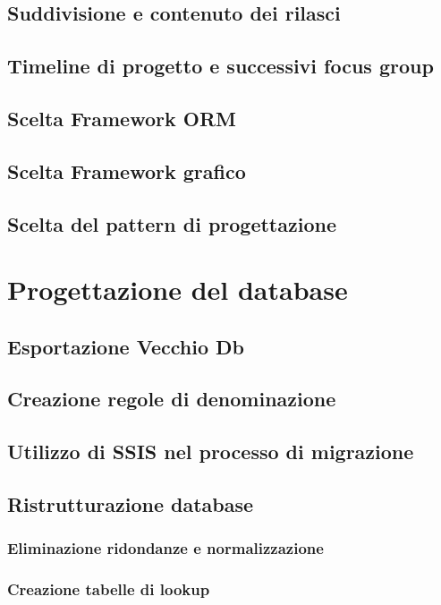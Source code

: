 \documentclass[12pt, a4paper]{article}
\begin{document}
\subsection{Suddivisione e contenuto dei rilasci}
\subsection{Timeline di progetto e successivi focus group}
\subsection{Scelta Framework ORM}
\subsection{Scelta Framework grafico} %
\subsection{Scelta del pattern di progettazione} %

\newpage
%
\section{Progettazione del database}
\subsection{Esportazione Vecchio Db}
\subsection{Creazione regole di denominazione}
\subsection{Utilizzo di SSIS nel processo di migrazione}

\subsection{Ristrutturazione database}
\subsubsection{Eliminazione ridondanze e normalizzazione}
\subsubsection{Creazione tabelle di lookup}
\end{document}
